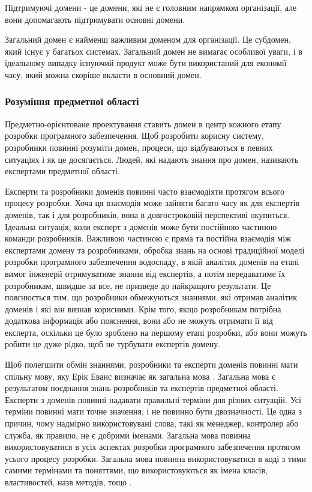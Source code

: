 Підтримуючі домени - це домени, які не є головним напрямком організації,
але вони допомагають підтримувати основні домени.

Загальний домен є найменш важливим доменом для організації.
Це субдомен, який існує у багатьох системах.
Загальний домен не вимагає особливої уваги,
і в ідеальному випадку існуючий продукт може бути використаний для економії часу,
який можна скоріше вкласти в основний домен.

\subsubsection{Розуміння предметної області}
Предметно-орієнтоване проектування ставить домен в центр кожного етапу розробки програмного забезпечення.
Щоб розробити корисну систему, розробники повинні розуміти домен,
процеси, що відбуваються в певних ситуаціях і як це досягається.
Людей, які надають знання про домен, називають експертами предметної області.

Експерти та розробники доменів повинні часто взаємодіяти протягом
всього процесу розробки. Хоча ця взаємодія може зайняти багато
часу як для експертів доменів, так і для розробників, вона
в довгостроковій перспективі окупиться. Ідеальна ситуація,
коли експерт з доменів може бути постійною частиною команди розробників.
Важливою частиною є пряма та постійна взаємодія між експертами домену
та розробниками, обробка знань на основі традиційної моделі розробки
програмного забезпечення водоспаду, в якій аналітик доменів на
етапі вимог інженерії отримуватиме знання від експертів,
а потім передаватиме їх розробникам, швидше за все,
не призведе до найкращого результати. Це пояснюється тим,
що розробники обмежуються знаннями, які отримав аналітик доменів
і які він визнав корисними. Крім того, якщо розробникам потрібна додаткова
інформація або пояснення, вони або не можуть отримати її від експерта,
оскільки це було зроблено на першому етапі розробки,
або вони можуть робити це дуже рідко, щоб не турбувати експертів домену.

Щоб полегшити обмін знаннями, розробники та експерти доменів повинні мати спільну мову,
яку Ерік Еванс визначає як загальна мова \cite{ddd-evans}.
Загальна мова є результатом поєднання знань розробників та експертів предметної області.
Експерти з доменів повинні надавати правильні терміни для різних ситуацій.
Усі терміни повинні мати точне значення, і не повинно бути двозначності. Це одна з причин,
чому надмірно використовувані слова, такі як менеджер, контролер або служба,
як правило, не є добрими іменами. Загальна мова повинна використовуватися
в усіх аспектах розробки програмного забезпечення протягом усього процесу розробки.
Загальна мова повинна використовуватися в коді з тими самими термінами та поняттями,
що використовуються як імена класів, властивостей, назв методів, тощо \cite{ddd-millett}.

